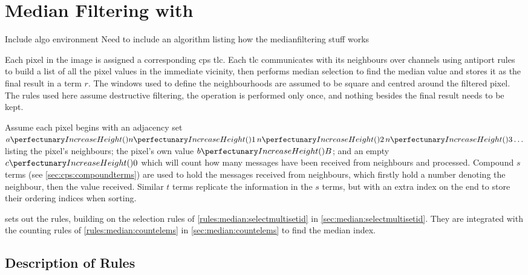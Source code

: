 \section{Median Filtering with }\label{sec:medianfilter}

\begin{anfxerror}{Include algo environment}
Need to include an algorithm listing how the \gls{medianfilter}ing stuff works
\end{anfxerror}

Each pixel in the image is assigned a corresponding \gls{cps} \gls{tlc}.  Each \gls{tlc} communicates with its neighbours over channels using antiport rules to build a list of all the pixel values in the immediate vicinity, then performs median selection to find the median value and stores it as the final result in a term \(r\).  The windows used to define the neighbourhoods are assumed to be square and centred around the filtered pixel. The rules used here assume destructive filtering, \ie{} the operation is performed only once, and nothing besides the final result needs to be kept.

Assume each pixel begins with an adjacency set \(\cpfunc{a}{\cpfunc{n}{1} \, \cpfunc{n}{2} \, \cpfunc{n}{3} \ldots}\) listing the pixel's neighbours; the pixel's own value \(\cpfunc{b}{B}\); and an empty \(\cpfunc{c}{0}\) which will count how many messages have been received from neighbours and processed.   Compound \(s\) terms (see \vref{sec:cps:compoundterms}) are used to hold the messages received from neighbours, which firstly hold a number denoting the neighbour, then the value received. Similar \(t\) terms replicate the information in the \(s\) terms, but with an extra index on the end to store their ordering indices when sorting.

 sets out the rules, building on the selection rules of \vref{rules:median:selectmultisetid} in \cref{sec:median:selectmultisetid}.  They are integrated with the counting rules of \vref{rules:median:countelems} in \cref{sec:median:countelems} to find the median index.

\subsection{Description of Rules}

